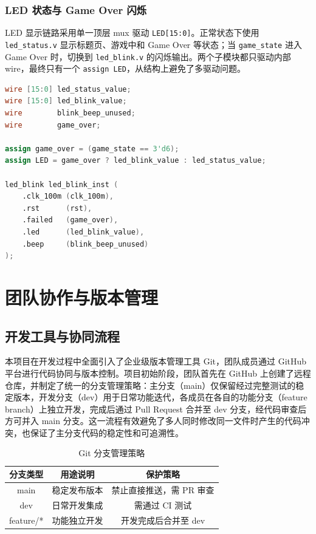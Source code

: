 \documentclass[UTF8,zihao=-4]{ctexart}
\begin{document}
\subsubsection{LED 状态与 Game Over 闪烁}
LED 显示链路采用单一顶层 mux 驱动 \texttt{LED[15:0]}。正常状态下使用 \texttt{led\_status.v} 显示标题页、游戏中和 Game Over 等状态；当 \texttt{game\_state} 进入 Game Over 时，切换到 \texttt{led\_blink.v} 的闪烁输出。两个子模块都只驱动内部 wire，最终只有一个 \texttt{assign LED}，从结构上避免了多驱动问题。

\begin{lstlisting}[language=Verilog,caption={LED 状态显示与 Game Over 闪烁的顶层 mux},label={lst:led_mux}]
wire [15:0] led_status_value;
wire [15:0] led_blink_value;
wire        blink_beep_unused;
wire        game_over;

assign game_over = (game_state == 3'd6);
assign LED = game_over ? led_blink_value : led_status_value;

led_blink led_blink_inst (
    .clk_100m (clk_100m),
    .rst      (rst),
    .failed   (game_over),
    .led      (led_blink_value),
    .beep     (blink_beep_unused)
);
\end{lstlisting}

\section{团队协作与版本管理}

\subsection{开发工具与协同流程}
本项目在开发过程中全面引入了企业级版本管理工具 Git，团队成员通过 GitHub 平台进行代码协同与版本控制。项目初始阶段，团队首先在 GitHub 上创建了远程仓库，并制定了统一的分支管理策略：主分支（main）仅保留经过完整测试的稳定版本，开发分支（dev）用于日常功能迭代，各成员在各自的功能分支（feature branch）上独立开发，完成后通过 Pull Request 合并至 dev 分支，经代码审查后方可并入 main 分支。这一流程有效避免了多人同时修改同一文件时产生的代码冲突，也保证了主分支代码的稳定性和可追溯性。

\begin{table}[H]
\centering
\begin{tabular}{ccc}
\toprule
分支类型 & 用途说明 & 保护策略 \\
\midrule
main & 稳定发布版本 & 禁止直接推送，需 PR 审查 \\
dev & 日常开发集成 & 需通过 CI 测试 \\
feature/* & 功能独立开发 & 开发完成后合并至 dev \\
\bottomrule
\end{tabular}
\caption{Git 分支管理策略}
\end{table}
\end{document}
